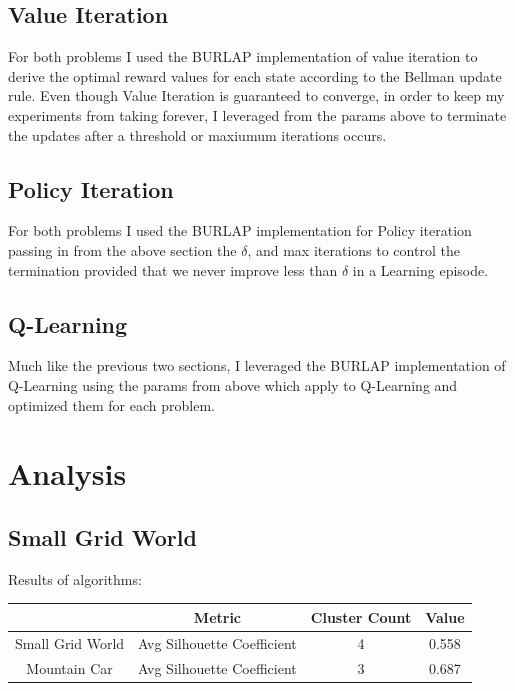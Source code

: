 \documentclass[11pt]{article}
\newcommand{\problemone}{Small Grid World}
\newcommand{\problemtwo}{Mountain Car}
\begin{document}
    \subsection{Value Iteration}
    For both problems I used the BURLAP implementation of value iteration to derive the optimal reward values for each state
    according to the Bellman update rule.
    Even though Value Iteration is guaranteed to converge, in order to keep my experiments from taking forever, I leveraged
    from the params above to terminate the updates after a threshold or maxiumum iterations occurs.
    \subsection{Policy Iteration}
    For both problems I used the BURLAP implementation for Policy iteration passing in from the above section the $\delta$,
    and max iterations to control the termination provided that we never improve less than $\delta$ in a Learning episode.
    \subsection{Q-Learning}
    Much like the previous two sections, I leveraged the BURLAP implementation of Q-Learning using the params from above
    which apply to Q-Learning and optimized them for each problem.


    \section{Analysis}
    \subsection{\problemone}
    Results of algorithms:
    \begin{center}
        \begin{tabular}{|c| c | c | c |}
            \hline
            & Metric                     & Cluster Count & Value \\
            \hline
            \hline
            \problemone & Avg Silhouette Coefficient & 4             & 0.558 \\
            \hline
            \problemtwo & Avg Silhouette Coefficient & 3             & 0.687 \\
            \hline
        \end{tabular}
    \end{center}
\end{document}
